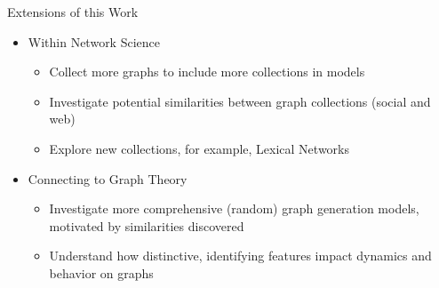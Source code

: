 \documentclass{beamer}
\begin{document}
\begin{frame}{Extensions of this Work}

\begin{itemize}
    \item Within Network Science
    \begin{itemize}
        \item Collect more graphs to include more collections in models%
        \item Investigate potential similarities between graph collections (social and web)
        \item Explore new collections, for example, Lexical Networks
    \end{itemize}

    \item Connecting to Graph Theory
    \begin{itemize}
        \item Investigate more comprehensive (random) graph generation models, motivated by similarities discovered
        \item Understand how distinctive, identifying features impact dynamics and behavior on graphs
    \end{itemize}
    
\end{itemize}

\end{frame}
\end{document}
